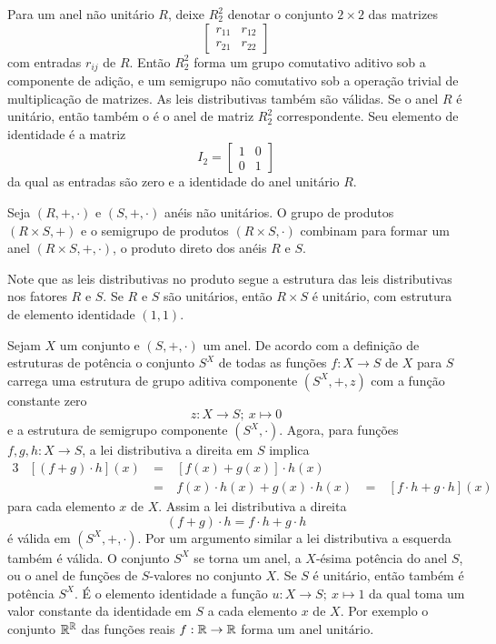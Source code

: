       \begin{exmp}
         Para um anel não unitário $R$, deixe $R^{2}_{2}$ denotar o conjunto $2\times 2$ das matrizes
         $$\begin{bmatrix}
            r_{11} & r_{12}\\
            r_{21} & r_{22}
         \end{bmatrix}$$
         com entradas $r_{ij}$ de $R$. Então $R^{2}_{2}$ forma um grupo comutativo aditivo sob a componente de adição, e um semigrupo não comutativo sob a operação trivial de multiplicação de matrizes. As leis distributivas também são válidas. Se o anel $R$ é unitário, então também o é o anel de matriz $R^{2}_{2}$ correspondente. Seu elemento de identidade é a matriz
         $$I_{2} =\begin{bmatrix}
            1 & 0\\
            0 & 1
      \end{bmatrix}$$ da qual as entradas são zero e a identidade do anel unitário $R$.
      \end{exmp}
      \begin{exmp}
         Seja $(R,+,\cdot)$ e $(S,+,\cdot)$ anéis não unitários. O grupo de produtos $(R\times S, +)$ e o semigrupo de produtos $(R\times S, \cdot)$ combinam para formar um anel $(R\times S, +, \cdot)$, o produto direto dos anéis $R$ e $S$.

         Note que as leis distributivas no produto segue a estrutura das leis distributivas nos fatores $R$ e $S$. Se $R$ e $S$ são unitários, então $R\times S$ é unitário, com estrutura de elemento identidade $(1,1)$.
      \end{exmp}
      \begin{exmp}
         Sejam $X$ um conjunto e $(S, +, \cdot)$ um anel. De acordo com a definição de estruturas de potência o conjunto $S^{X}$ de todas as funções $f: X \to S$ de $X$ para $S$ carrega uma estrutura de grupo aditiva componente $(S^{X},+, z)$ com a função constante zero $$z: X \to S;\ x\mapsto 0$$ e a estrutura de semigrupo componente $(S^{X}, \cdot)$. Agora, para funções $f,g,h: X\to S$, a lei distributiva a direita em $S$ implica
         \begin{alignat*}{3}
            & [(f+g)\cdot h](x)\ &=&\ [f(x)+g(x)] \cdot h(x)\\
            & &=&\ f(x) \cdot h(x) + g(x) \cdot h(x)\ &=&\ [f\cdot h+g \cdot h](x)  
         \end{alignat*}
         para cada elemento $x$ de $X$. Assim a lei distributiva a direita $$(f+g) \cdot h = f\cdot h +g \cdot h$$ é válida em $(S^{X},+,\cdot)$. Por um argumento similar a lei distributiva a esquerda também é válida. O conjunto $S^{X}$ se torna um anel, a $X$-ésima potência do anel $S$, ou o anel de funções de $S$-valores no conjunto $X$. Se $S$ é unitário, então também é potência $S^{X}$. É o elemento identidade a função $u: X\to S;\ x\mapsto 1$ da qual toma um valor constante da identidade em $S$ a cada elemento $x$ de $X$. Por exemplo o conjunto $\mathbb{R}^{\mathbb{R}}$ das funções reais $f: \mathbb{R} \to \mathbb{R}$ forma um anel unitário.
      \end{exmp}

